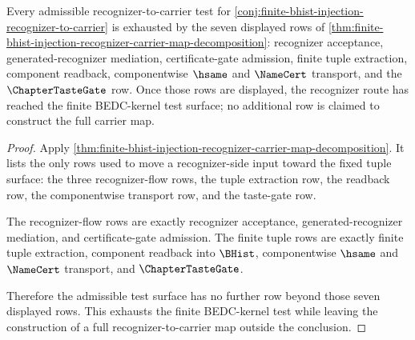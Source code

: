 \begin{theorem}
\label{thm:finite-bhist-injection-recognizer-row-exhaustion}
Every admissible recognizer-to-carrier test for \autoref{conj:finite-bhist-injection-recognizer-to-carrier} is exhausted by the seven displayed rows of \autoref{thm:finite-bhist-injection-recognizer-carrier-map-decomposition}: recognizer acceptance, generated-recognizer mediation, certificate-gate admission, finite tuple extraction, component readback, componentwise $\hsame$ and $\NameCert$ transport, and the $\ChapterTasteGate$ row. Once those rows are displayed, the recognizer route has reached the finite BEDC-kernel test surface; no additional row is claimed to construct the full carrier map.
\end{theorem}
\begin{proof}
Apply \autoref{thm:finite-bhist-injection-recognizer-carrier-map-decomposition}. It lists the only rows used to move a recognizer-side input toward the fixed tuple surface: the three recognizer-flow rows, the tuple extraction row, the readback row, the componentwise transport row, and the taste-gate row.

The recognizer-flow rows are exactly recognizer acceptance, generated-recognizer mediation, and certificate-gate admission. The finite tuple rows are exactly finite tuple extraction, component readback into $\BHist$, componentwise $\hsame$ and $\NameCert$ transport, and $\ChapterTasteGate$.

Therefore the admissible test surface has no further row beyond those seven displayed rows. This exhausts the finite BEDC-kernel test while leaving the construction of a full recognizer-to-carrier map outside the conclusion.
\end{proof}

